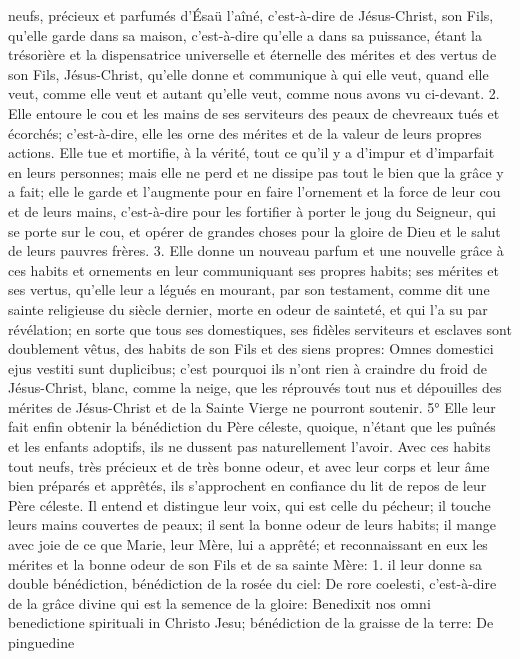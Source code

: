 neufs, précieux et parfumés d'Ésaü l'aîné, c'est-à-dire de Jésus-Christ, son Fils, qu'elle garde dans sa maison,
c'est-à-dire qu'elle a dans sa puissance, étant la trésorière et la dispensatrice universelle et éternelle des mérites
et des vertus de son Fils, Jésus-Christ, qu'elle donne et communique à qui elle veut, quand elle veut, comme elle
veut et autant qu'elle veut, comme nous avons vu ci-devant. 2. Elle entoure le cou et les mains de ses serviteurs
des peaux de chevreaux tués et écorchés; c'est-à-dire, elle les orne des mérites et de la valeur de leurs propres
actions. Elle tue et mortifie, à la vérité, tout ce qu'il y a d'impur et d'imparfait en leurs personnes; mais elle ne perd
et ne dissipe pas tout le bien que la grâce y a fait; elle le garde et l'augmente pour en faire l'ornement et la force de
leur cou et de leurs mains, c'est-à-dire pour les fortifier à porter le joug du Seigneur, qui se porte sur le cou, et
opérer de grandes choses pour la gloire de Dieu et le salut de leurs pauvres frères. 3. Elle donne un nouveau
parfum et une nouvelle grâce à ces habits et ornements en leur communiquant ses propres habits; ses mérites et
ses vertus, qu'elle leur a légués en mourant, par son testament, comme dit une sainte religieuse du siècle dernier,
morte en odeur de sainteté, et qui l'a su par révélation; en sorte que tous ses domestiques, ses fidèles serviteurs
et esclaves sont doublement vêtus, des habits de son Fils et des siens propres: Omnes domestici ejus vestiti sunt
duplicibus; c'est pourquoi ils n'ont rien à craindre du froid de Jésus-Christ, blanc, comme la neige, que les
réprouvés tout nus et dépouilles des mérites de Jésus-Christ et de la Sainte Vierge ne pourront soutenir.
 5° Elle leur fait enfin obtenir la bénédiction du Père céleste, quoique, n'étant que les puînés et les enfants
adoptifs, ils ne dussent pas naturellement l'avoir. Avec ces habits tout neufs, très précieux et de très bonne odeur,
et avec leur corps et leur âme bien préparés et apprêtés, ils s'approchent en confiance du lit de repos de leur Père
céleste. Il entend et distingue leur voix, qui est celle du pécheur; il touche leurs mains couvertes de peaux; il sent
la bonne odeur de leurs habits; il mange avec joie de ce que Marie, leur Mère, lui a apprêté; et reconnaissant en
eux les mérites et la bonne odeur de son Fils et de sa sainte Mère: 1. il leur donne sa double bénédiction,
bénédiction de la rosée du ciel: De rore coelesti, c'est-à-dire de la grâce divine qui est la semence de la gloire:
Benedixit nos omni benedictione spirituali in Christo Jesu; bénédiction de la graisse de la terre: De pinguedine
